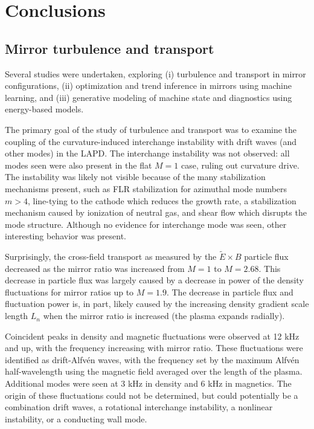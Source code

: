 \chapter{Conclusions}
\label{ch:conclusion}

\section{Mirror turbulence and transport}

Several studies were undertaken, exploring (i) turbulence and transport in mirror configurations, (ii) optimization and trend inference in mirrors using machine learning, and (iii) generative modeling of machine state and diagnostics using energy-based models. 

The primary goal of the study of turbulence and transport was to examine the coupling of the curvature-induced interchange instability with drift waves (and other modes) in the LAPD. The interchange instability was not observed: all modes seen were also present in the flat $M=1$ case, ruling out curvature drive. The instability was likely not visible because of the many stabilization mechanisms present, such as FLR stabilization for azimuthal mode numbers $m>4$, line-tying to the cathode which reduces the growth rate, a stabilization mechanism caused by ionization of neutral gas, and shear flow which disrupts the mode structure. Although no evidence for interchange mode was seen, other interesting behavior was present. 

Surprisingly, the cross-field transport as measured by the $\tilde{E} \times B$ particle flux decreased as the mirror ratio was increased from $M=1$ to $M=2.68$. This decrease in particle flux was largely caused by a decrease in power of the density fluctuations for mirror ratios up to $M=1.9$. The decrease in particle flux and fluctuation power is, in part, likely caused by the increasing density gradient scale length $L_n$ when the mirror ratio is increased (the plasma expands radially). 

Coincident peaks in density and magnetic fluctuations were observed at 12 kHz and up, with the frequency increasing with mirror ratio. These fluctuations were identified as drift-Alfv\'en waves, with the frequency set by the maximum Alfv\'en half-wavelength using the magnetic field averaged over the length of the plasma. Additional modes were seen at 3 kHz in density and 6 kHz in magnetics. The origin of these fluctuations could not be determined, but could potentially be a combination drift waves, a rotational interchange instability, a nonlinear instability, or a conducting wall mode. 

